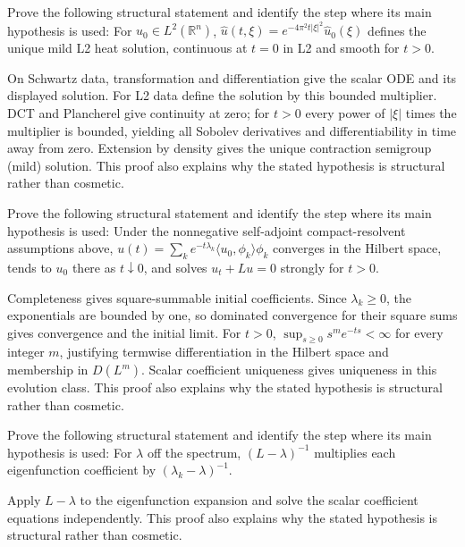 \begin{problem}\label{prob:iii28-problem-09}
Prove the following structural statement and identify the step where its main hypothesis is used: For $u_0\in L^2(\mathbb R^n)$, $\widehat u(t,\xi)=e^{-4\pi^2t|\xi|^2}\widehat u_0(\xi)$ defines the unique mild L2 heat solution, continuous at $t=0$ in L2 and smooth for $t>0$.
\end{problem}
\begin{solution}
On Schwartz data, transformation and differentiation give the scalar ODE and its displayed solution. For L2 data define the solution by this bounded multiplier. DCT and Plancherel give continuity at zero; for $t>0$ every power of $|\xi|$ times the multiplier is bounded, yielding all Sobolev derivatives and differentiability in time away from zero. Extension by density gives the unique contraction semigroup (mild) solution. This proof also explains why the stated hypothesis is structural rather than cosmetic.
\end{solution}

\begin{problem}\label{prob:iii28-problem-10}
Prove the following structural statement and identify the step where its main hypothesis is used: Under the nonnegative self-adjoint compact-resolvent assumptions above, $u(t)=\sum_ke^{-t\lambda_k}\langle u_0,\phi_k\rangle\phi_k$ converges in the Hilbert space, tends to $u_0$ there as $t\downarrow0$, and solves $u_t+Lu=0$ strongly for $t>0$.
\end{problem}
\begin{solution}
Completeness gives square-summable initial coefficients. Since $\lambda_k\ge0$, the exponentials are bounded by one, so dominated convergence for their square sums gives convergence and the initial limit. For $t>0$, $\sup_{s\ge0}s^me^{-ts}<\infty$ for every integer $m$, justifying termwise differentiation in the Hilbert space and membership in $D(L^m)$. Scalar coefficient uniqueness gives uniqueness in this evolution class. This proof also explains why the stated hypothesis is structural rather than cosmetic.
\end{solution}

\begin{problem}\label{prob:iii28-problem-11}
Prove the following structural statement and identify the step where its main hypothesis is used: For $\lambda$ off the spectrum, $(L-\lambda)^{-1}$ multiplies each eigenfunction coefficient by $(\lambda_k-\lambda)^{-1}$.
\end{problem}
\begin{solution}
Apply $L-\lambda$ to the eigenfunction expansion and solve the scalar coefficient equations independently. This proof also explains why the stated hypothesis is structural rather than cosmetic.
\end{solution}

